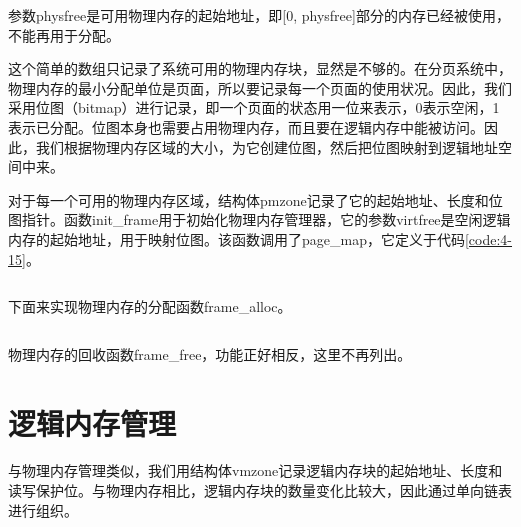 \documentclass[main.tex]{subfiles}
\begin{document}
\begin{CJK*}{UTF8}{song}
\begin{code}
\label{code:4-8}
\inputminted[firstline=219,lastline=228,linenos,numbersep=5pt,frame=lines,framesep=2mm]{c}{src/chapter04/kernel/machdep.c}
\end{code}

\noindent
参数physfree是可用物理内存的起始地址，即[0, physfree]部分的内存已经被使用，不能再用于分配。

\par
这个简单的数组只记录了系统可用的物理内存块，显然是不够的。在分页系统中，物理内存的最小分配单位是页面，所以要记录每一个页面的使用状况。因此，我们采用位图（bitmap）进行记录，即一个页面的状态用一位来表示，0表示空闲，1表示已分配。位图本身也需要占用物理内存，而且要在逻辑内存中能被访问。因此，我们根据物理内存区域的大小，为它创建位图，然后把位图映射到逻辑地址空间中来。

\par
对于每一个可用的物理内存区域，结构体pmzone记录了它的起始地址、长度和位图指针。函数init\_frame用于初始化物理内存管理器，它的参数virtfree是空闲逻辑内存的起始地址，用于映射位图。该函数调用了page\_map，它定义于代码\ref{code:4-15}。

\begin{code}
\label{code:4-9}
\inputminted[firstline=23,lastline=54,linenos,numbersep=5pt,frame=lines,framesep=2mm]{c}{src/chapter04/kernel/frame.c}
\end{code}

下面来实现物理内存的分配函数frame\_alloc。

\begin{code}
\label{code:4-10}
\inputminted[firstline=82,lastline=105,linenos,numbersep=5pt,frame=lines,framesep=2mm]{c}{src/chapter04/kernel/frame.c}
\end{code}

\par
物理内存的回收函数frame\_free，功能正好相反，这里不再列出。

\section{逻辑内存管理}
与物理内存管理类似，我们用结构体vmzone记录逻辑内存块的起始地址、长度和读写保护位。与物理内存相比，逻辑内存块的数量变化比较大，因此通过单向链表进行组织。

\begin{code}
\label{code:4-11}
\inputminted[firstline=24,lastline=36,linenos,numbersep=5pt,frame=lines,framesep=2mm]{c}{src/chapter04/kernel/page.c}
\end{code}


\end{CJK*}
\end{document}

